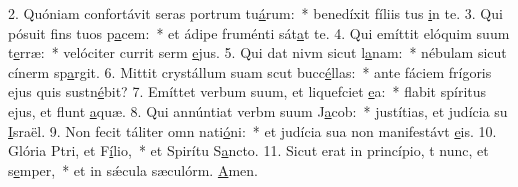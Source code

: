 2. Quóniam confortávit seras portrum tu\uline{á}rum:~* benedíxit fíliis tus \uline{i}n te.
3. Qui pósuit fins tuos p\uline{a}cem:~* et ádipe fruménti sát\uline{a}t te.
4. Qui emíttit elóquim suum t\uline{e}rræ:~* velóciter currit serm \uline{e}jus.
5. Qui dat nivm sicut l\uline{a}nam:~* nébulam sicut cínerm sp\uline{a}rgit.
6. Mittit crystállum suam scut bucc\uline{é}llas:~* ante fáciem frígoris ejus quis sustn\uline{é}bit?
7. Emíttet verbum suum, et liquefciet \uline{e}a:~* flabit spíritus ejus, et flunt \uline{a}quæ.
8. Qui annúntiat verbm suum J\uline{a}cob:~* justítias, et judícia su \uline{I}sraël.
9. Non fecit táliter omn nati\uline{ó}ni:~* et judícia sua non manifestávt \uline{e}is.
10. Glória Ptri, et F\uline{í}lio,~* et Spirítu S\uline{a}ncto.
11. Sicut erat in princípio, t nunc, et s\uline{e}mper,~* et in sǽcula sæculórm. \uline{A}men.
